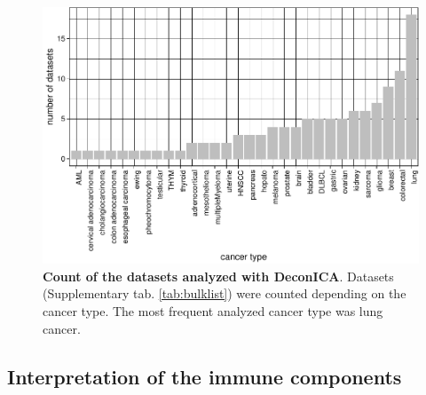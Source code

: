 \documentclass[12pt,]{book}
\theoremstyle{definition}
\theoremstyle{definition}
\theoremstyle{definition}
\theoremstyle{remark}
\begin{document}
\begin{figure}

{\centering \includegraphics[width=0.8\linewidth]{UCzPhDThesis_files/figure-latex/datasetcount-1} 

}

\caption[Count of the dasets analyzed with DeconICA]{\textbf{Count of the datasets analyzed with
DeconICA}. Datasets (Supplementary tab. \ref{tab:bulklist}) were counted
depending on the cancer type. The most frequent analyzed cancer type was
lung cancer.}\label{fig:datasetcount}
\end{figure}






\hypertarget{interpretation-of-the-immune-components}{%
\subsection{Interpretation of the immune
components}\label{interpretation-of-the-immune-components}}
\end{document}
